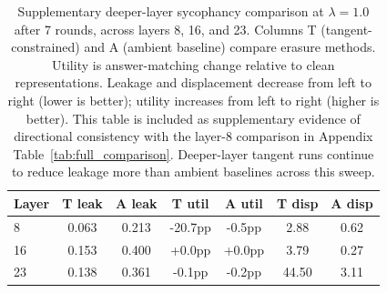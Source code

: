 \begin{table}[t]
\centering
\caption{Supplementary deeper-layer sycophancy comparison at $\lambda=1.0$ after 7 rounds, across layers 8, 16, and 23. Columns T (tangent-constrained) and A (ambient baseline) compare erasure methods. Utility is answer-matching change relative to clean representations. Leakage and displacement decrease from left to right (lower is better); utility increases from left to right (higher is better). This table is included as supplementary evidence of directional consistency with the layer-8 comparison in Appendix Table~\ref{tab:full_comparison}. Deeper-layer tangent runs continue to reduce leakage more than ambient baselines across this sweep.}
\label{tab:repo_snapshot_sycophancy}
\small
\begin{tabular}{lcccccc}
\toprule
Layer & T leak & A leak & T util & A util & T disp & A disp \\
\midrule
8 & 0.063 & 0.213 & -20.7pp & -0.5pp & 2.88 & 0.62 \\
16 & 0.153 & 0.400 & +0.0pp & +0.0pp & 3.79 & 0.27 \\
23 & 0.138 & 0.361 & -0.1pp & -0.2pp & 44.50 & 3.11 \\
\bottomrule
\end{tabular}
\end{table}
